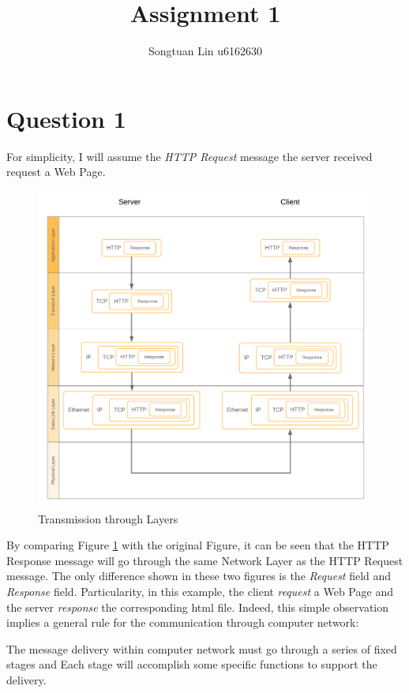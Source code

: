 \documentclass[10pt,a4paper]{article}
\author{Songtuan Lin u6162630}
\title{Assignment 1}
\begin{document}
\maketitle

\section*{Question 1}
For simplicity, I will assume the \textit{HTTP Request} message the server received request a Web Page. 
\begin{figure}[H]
	\center
	\includegraphics[scale=0.7]{Layers}
	\caption{Transmission through Layers}
	\label{fig_1}
\end{figure}
By comparing Figure \ref{fig_1} with the original Figure, it can be seen that the HTTP Response message will go through the same Network Layer as the HTTP Request message. The only difference shown in these two figures is the \textit{Request} field and \textit{Response} field. Particularity, in this example, the client \textit{request} a Web Page and the server \textit{response} the corresponding html file. Indeed, this simple observation implies a general rule for the communication through computer network:
\begin{center}
	\begin{tcolorbox}[colback=lightgray, width=0.75\textwidth]
		The message delivery within computer network must go through a series of fixed stages and Each stage will accomplish some specific functions to support the delivery.
	\end{tcolorbox}
\end{center}
\end{document}
